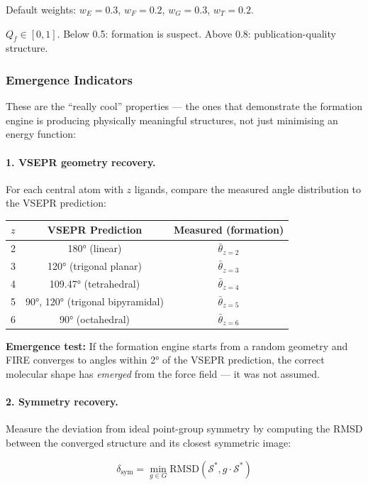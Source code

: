 \documentclass[11pt, a4paper, oneside]{article}
\theoremstyle{definition}
\theoremstyle{remark}
\begin{document}
Default weights: $w_E = 0.3$, $w_F = 0.2$, $w_G = 0.3$, $w_T = 0.2$.

$Q_f \in [0, 1]$.  Below 0.5: formation is suspect.  Above 0.8:
publication-quality structure.

\subsubsection{Emergence Indicators}

These are the ``really cool'' properties — the ones that demonstrate
the formation engine is producing physically meaningful structures, not
just minimising an energy function:

\paragraph{1. VSEPR geometry recovery.}
For each central atom with $z$ ligands, compare the measured
angle distribution to the VSEPR prediction:

\begin{center}
\begin{tabular}{lcc}
\toprule
$z$ & VSEPR Prediction & Measured (formation) \\
\midrule
2 & 180° (linear) & $\bar{\theta}_{z=2}$ \\
3 & 120° (trigonal planar) & $\bar{\theta}_{z=3}$ \\
4 & 109.47° (tetrahedral) & $\bar{\theta}_{z=4}$ \\
5 & 90°, 120° (trigonal bipyramidal) & $\bar{\theta}_{z=5}$ \\
6 & 90° (octahedral) & $\bar{\theta}_{z=6}$ \\
\bottomrule
\end{tabular}
\end{center}

\textbf{Emergence test:} If the formation engine starts from a random
geometry and FIRE converges to angles within 2° of the VSEPR
prediction, the correct molecular shape has \textit{emerged} from the
force field — it was not assumed.

\paragraph{2. Symmetry recovery.}
Measure the deviation from ideal point-group symmetry by computing the
RMSD between the converged structure and its closest symmetric image:

\begin{equation}
\delta_{\text{sym}} = \min_{g \in G} \text{RMSD}(\mathcal{S}^*, g \cdot \mathcal{S}^*)
\end{equation}
\end{document}
